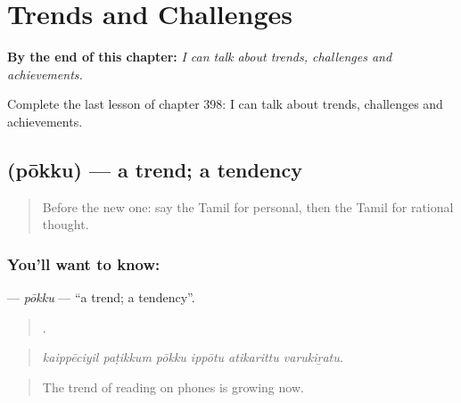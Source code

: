 
\chapter{Trends and Challenges}
\label{ch:ta-trends-and-challenges}

\begin{chapteropening}
\textbf{By the end of this chapter:} \emph{I can talk about trends, challenges and achievements.}

Complete the last lesson of chapter 398: I can talk about trends, challenges and achievements.
\end{chapteropening}

\section[\texorpdfstring{\ta{போக்கு} (pōkku)}{போக்கு (pōkku)}]{ (pōkku) — a trend; a tendency}

\label{lesson:TA-C398-pokku}



\begin{quote}
Before the new one: say the Tamil for personal, then the Tamil for rational thought.
\end{quote}

\subsection*{You'll want to know: }
\textbf{} — \emph{pōkku} — \textquotedblleft{}a trend; a tendency\textquotedblright{}.

\begin{quote}
     .
\end{quote}

\begin{quote}
\emph{kaippēciyil paṭikkum pōkku ippōtu atikarittu varukiṟatu.}
\end{quote}

\begin{quote}
The trend of reading on phones is growing now.
\end{quote}

